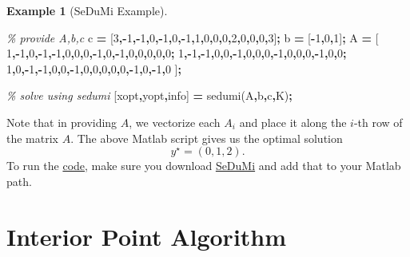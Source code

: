 \documentclass[
]{book}
\newenvironment{Shaded}{\begin{snugshade}}{\end{snugshade}}
\newcommand{\CommentTok}[1]{\textcolor[rgb]{0.56,0.35,0.01}{\textit{#1}}}
\newcommand{\FloatTok}[1]{\textcolor[rgb]{0.00,0.00,0.81}{#1}}
\newcommand{\NormalTok}[1]{#1}
\newcommand{\OperatorTok}[1]{\textcolor[rgb]{0.81,0.36,0.00}{\textbf{#1}}}
\newcommand{\VariableTok}[1]{\textcolor[rgb]{0.00,0.00,0.00}{#1}}
\theoremstyle{definition}
\theoremstyle{definition}
\newtheorem{example}{Example}[chapter]
\theoremstyle{definition}
\theoremstyle{definition}
\theoremstyle{remark}
\begin{document}
\begin{example}[SeDuMi Example]
\begin{Shaded}
\begin{Highlighting}[]
\CommentTok{\% provide A,b,c}
\VariableTok{c} \OperatorTok{=}\NormalTok{ [}\FloatTok{3}\OperatorTok{,{-}}\FloatTok{1}\OperatorTok{,{-}}\FloatTok{1}\OperatorTok{,}\FloatTok{0}\OperatorTok{,{-}}\FloatTok{1}\OperatorTok{,}\FloatTok{0}\OperatorTok{,{-}}\FloatTok{1}\OperatorTok{,}\FloatTok{1}\OperatorTok{,}\FloatTok{0}\OperatorTok{,}\FloatTok{0}\OperatorTok{,}\FloatTok{0}\OperatorTok{,}\FloatTok{2}\OperatorTok{,}\FloatTok{0}\OperatorTok{,}\FloatTok{0}\OperatorTok{,}\FloatTok{0}\OperatorTok{,}\FloatTok{3}\NormalTok{]}\OperatorTok{;}
\VariableTok{b} \OperatorTok{=}\NormalTok{ [}\OperatorTok{{-}}\FloatTok{1}\OperatorTok{,}\FloatTok{0}\OperatorTok{,}\FloatTok{1}\NormalTok{]}\OperatorTok{;}
\VariableTok{A} \OperatorTok{=}\NormalTok{ [}
    \FloatTok{1}\OperatorTok{,{-}}\FloatTok{1}\OperatorTok{,}\FloatTok{0}\OperatorTok{,{-}}\FloatTok{1}\OperatorTok{,{-}}\FloatTok{1}\OperatorTok{,}\FloatTok{0}\OperatorTok{,}\FloatTok{0}\OperatorTok{,}\FloatTok{0}\OperatorTok{,{-}}\FloatTok{1}\OperatorTok{,}\FloatTok{0}\OperatorTok{,{-}}\FloatTok{1}\OperatorTok{,}\FloatTok{0}\OperatorTok{,}\FloatTok{0}\OperatorTok{,}\FloatTok{0}\OperatorTok{,}\FloatTok{0}\OperatorTok{,}\FloatTok{0}\OperatorTok{;}
    \FloatTok{1}\OperatorTok{,{-}}\FloatTok{1}\OperatorTok{,{-}}\FloatTok{1}\OperatorTok{,}\FloatTok{0}\OperatorTok{,}\FloatTok{0}\OperatorTok{,{-}}\FloatTok{1}\OperatorTok{,}\FloatTok{0}\OperatorTok{,}\FloatTok{0}\OperatorTok{,}\FloatTok{0}\OperatorTok{,{-}}\FloatTok{1}\OperatorTok{,}\FloatTok{0}\OperatorTok{,}\FloatTok{0}\OperatorTok{,}\FloatTok{0}\OperatorTok{,{-}}\FloatTok{1}\OperatorTok{,}\FloatTok{0}\OperatorTok{,}\FloatTok{0}\OperatorTok{;}
    \FloatTok{1}\OperatorTok{,}\FloatTok{0}\OperatorTok{,{-}}\FloatTok{1}\OperatorTok{,{-}}\FloatTok{1}\OperatorTok{,}\FloatTok{0}\OperatorTok{,}\FloatTok{0}\OperatorTok{,{-}}\FloatTok{1}\OperatorTok{,}\FloatTok{0}\OperatorTok{,}\FloatTok{0}\OperatorTok{,}\FloatTok{0}\OperatorTok{,}\FloatTok{0}\OperatorTok{,}\FloatTok{0}\OperatorTok{,{-}}\FloatTok{1}\OperatorTok{,}\FloatTok{0}\OperatorTok{,{-}}\FloatTok{1}\OperatorTok{,}\FloatTok{0}
\NormalTok{    ]}\OperatorTok{;}

\CommentTok{\% solve using sedumi}
\NormalTok{[}\VariableTok{xopt}\OperatorTok{,}\VariableTok{yopt}\OperatorTok{,}\VariableTok{info}\NormalTok{] }\OperatorTok{=} \VariableTok{sedumi}\NormalTok{(}\VariableTok{A}\OperatorTok{,}\VariableTok{b}\OperatorTok{,}\VariableTok{c}\OperatorTok{,}\VariableTok{K}\NormalTok{)}\OperatorTok{;}
\end{Highlighting}
\end{Shaded}

Note that in providing \(A\), we vectorize each \(A_i\) and place it along the \(i\)-th row of the matrix \(A\).
The above Matlab script gives us the optimal solution
\[
y^\star = (0,1,2).
\]
To run the \href{https://github.com/ComputationalRobotics/Semidefinite-Examples/blob/main/sedumi_example.m}{code}, make sure you download \href{https://github.com/sqlp/sedumi}{SeDuMi} and add that to your Matlab path.
\end{example}

\hypertarget{interior-point-algorithm}{%
\section{Interior Point Algorithm}\label{interior-point-algorithm}}

  
\end{document}

